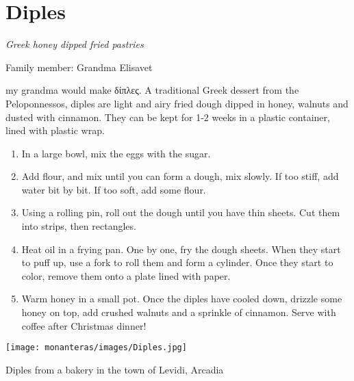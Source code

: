 \chapter{Diples}
\label{ch:diples}


\textit{Greek honey dipped fried pastries}

Family member: Grandma Elisavet

 my grandma would make \textgreek{δίπλες}. A traditional Greek dessert from the Peloponnessos, diples are light and airy fried dough dipped in honey, walnuts and dusted with cinnamon. They can be kept for 1-2 weeks in a plastic container, lined with plastic wrap.

\begin{enumerate}
    \item In a large bowl, mix the eggs with the sugar. 
    \item Add flour, and mix until you can form a dough, mix slowly. If too stiff, add water bit by bit. If too soft, add some flour.
    \item Using a rolling pin, roll out the dough until you have thin sheets. Cut them into strips, then rectangles.
    \item Heat oil in a frying pan. One by one, fry the dough sheets. When they start to puff up, use a fork to roll them and form a cylinder. Once they start to color, remove them onto a plate lined with paper.
    \item Warm honey in a small pot. Once the diples have cooled down, drizzle some honey on top, add crushed walnuts and a sprinkle of cinnamon. Serve with coffee after Christmas dinner!
\end{enumerate}

\begin{marginfigure}
  \texttt{[image: monanteras/images/Diples.jpg]}
  \caption{Diples from a bakery in the town of Levidi, Arcadia}
\end{marginfigure}
